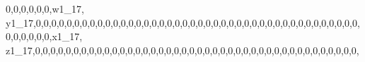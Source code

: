 \documentclass[]{article}
\newenvironment{Shaded}{\begin{snugshade}}{\end{snugshade}}
\newcommand{\DecValTok}[1]{\textcolor[rgb]{0.00,0.00,0.81}{#1}}
\newcommand{\NormalTok}[1]{#1}
\begin{document}
\begin{Shaded}
\begin{Highlighting}[]
\DecValTok{0}\NormalTok{,}\DecValTok{0}\NormalTok{,}\DecValTok{0}\NormalTok{,}\DecValTok{0}\NormalTok{,}\DecValTok{0}\NormalTok{,}\DecValTok{0}\NormalTok{,w1_}\DecValTok{17}\NormalTok{, y1_}\DecValTok{17}\NormalTok{,}\DecValTok{0}\NormalTok{,}\DecValTok{0}\NormalTok{,}\DecValTok{0}\NormalTok{,}\DecValTok{0}\NormalTok{,}\DecValTok{0}\NormalTok{,}\DecValTok{0}\NormalTok{,}\DecValTok{0}\NormalTok{,}\DecValTok{0}\NormalTok{,}\DecValTok{0}\NormalTok{,}\DecValTok{0}\NormalTok{,}\DecValTok{0}\NormalTok{,}\DecValTok{0}\NormalTok{,}\DecValTok{0}\NormalTok{,}\DecValTok{0}\NormalTok{,}\DecValTok{0}\NormalTok{,}\DecValTok{0}\NormalTok{,}\DecValTok{0}\NormalTok{,}\DecValTok{0}\NormalTok{,}\DecValTok{0}\NormalTok{,}\DecValTok{0}\NormalTok{,}\DecValTok{0}\NormalTok{,}\DecValTok{0}\NormalTok{,}\DecValTok{0}\NormalTok{,}\DecValTok{0}\NormalTok{,}\DecValTok{0}\NormalTok{,}\DecValTok{0}\NormalTok{,}\DecValTok{0}\NormalTok{,}\DecValTok{0}\NormalTok{,}\DecValTok{0}\NormalTok{,}\DecValTok{0}\NormalTok{,}\DecValTok{0}\NormalTok{,}\DecValTok{0}\NormalTok{,}\DecValTok{0}\NormalTok{,}\DecValTok{0}\NormalTok{,}\DecValTok{0}\NormalTok{,}\DecValTok{0}\NormalTok{,}\DecValTok{0}\NormalTok{,}\DecValTok{0}\NormalTok{,}\DecValTok{0}\NormalTok{,}\DecValTok{0}\NormalTok{,}\DecValTok{0}\NormalTok{,}\DecValTok{0}\NormalTok{,}
\DecValTok{0}\NormalTok{,}\DecValTok{0}\NormalTok{,}\DecValTok{0}\NormalTok{,}\DecValTok{0}\NormalTok{,}\DecValTok{0}\NormalTok{,}\DecValTok{0}\NormalTok{,x1_}\DecValTok{17}\NormalTok{, z1_}\DecValTok{17}\NormalTok{,}\DecValTok{0}\NormalTok{,}\DecValTok{0}\NormalTok{,}\DecValTok{0}\NormalTok{,}\DecValTok{0}\NormalTok{,}\DecValTok{0}\NormalTok{,}\DecValTok{0}\NormalTok{,}\DecValTok{0}\NormalTok{,}\DecValTok{0}\NormalTok{,}\DecValTok{0}\NormalTok{,}\DecValTok{0}\NormalTok{,}\DecValTok{0}\NormalTok{,}\DecValTok{0}\NormalTok{,}\DecValTok{0}\NormalTok{,}\DecValTok{0}\NormalTok{,}\DecValTok{0}\NormalTok{,}\DecValTok{0}\NormalTok{,}\DecValTok{0}\NormalTok{,}\DecValTok{0}\NormalTok{,}\DecValTok{0}\NormalTok{,}\DecValTok{0}\NormalTok{,}\DecValTok{0}\NormalTok{,}\DecValTok{0}\NormalTok{,}\DecValTok{0}\NormalTok{,}\DecValTok{0}\NormalTok{,}\DecValTok{0}\NormalTok{,}\DecValTok{0}\NormalTok{,}\DecValTok{0}\NormalTok{,}\DecValTok{0}\NormalTok{,}\DecValTok{0}\NormalTok{,}\DecValTok{0}\NormalTok{,}\DecValTok{0}\NormalTok{,}\DecValTok{0}\NormalTok{,}\DecValTok{0}\NormalTok{,}\DecValTok{0}\NormalTok{,}\DecValTok{0}\NormalTok{,}\DecValTok{0}\NormalTok{,}\DecValTok{0}\NormalTok{,}\DecValTok{0}\NormalTok{,}\DecValTok{0}\NormalTok{,}\DecValTok{0}\NormalTok{,}\DecValTok{0}\NormalTok{,}\DecValTok{0}\NormalTok{,}

\end{Highlighting}
\end{Shaded}
\end{document}
